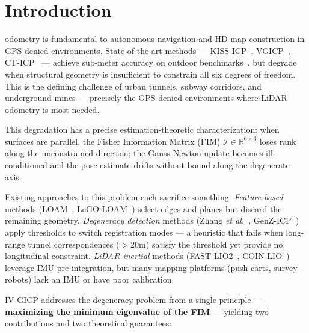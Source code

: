 \documentclass[journal,letterpaper,10pt]{IEEEtran}
\newcommand{\FIM}{\mathcal{I}}
\newcommand{\etal}{\textit{et al.}}
\begin{document}
\section{Introduction}\label{sec:intro}

 odometry is fundamental to autonomous navigation and HD map
construction in GPS-denied environments.
State-of-the-art methods --- KISS-ICP~\cite{vizzo2023kiss},
VGICP~\cite{koide2021voxel}, CT-ICP~\cite{dellenbach2022ct} ---
achieve sub-meter accuracy on outdoor benchmarks~\cite{geiger2013kitti},
but degrade when structural geometry is insufficient to constrain all
six degrees of freedom.
This is the defining challenge of urban tunnels, subway corridors, and
underground mines --- precisely the GPS-denied environments where
LiDAR odometry is most needed.

This degradation has a precise estimation-theoretic characterization:
when surfaces are parallel, the Fisher Information Matrix (FIM)
$\FIM \in \mathbb{R}^{6\times6}$ loses rank along the unconstrained
direction; the Gauss-Newton update becomes ill-conditioned and the
pose estimate drifts without bound along the degenerate axis.

Existing approaches to this problem each sacrifice something.
\textit{Feature-based} methods (LOAM~\cite{zhang2014loam},
LeGO-LOAM~\cite{shan2018lego}) select edges and planes but discard
the remaining geometry.
\textit{Degeneracy detection} methods
(Zhang \etal~\cite{zhang2016degeneracy},
GenZ-ICP~\cite{zhang2024genz})
apply thresholds to switch registration modes --- a heuristic
that fails when long-range tunnel correspondences ($>$20m) satisfy the
threshold yet provide no longitudinal constraint.
\textit{LiDAR-inertial} methods
(FAST-LIO2~\cite{xu2022fastlio2}, COIN-LIO~\cite{pfreundschuh2024coinlio})
leverage IMU pre-integration, but many mapping platforms
(push-carts, survey robots) lack an IMU or have poor calibration.

IV-GICP addresses the degeneracy problem from a single principle ---
\textbf{maximizing the minimum eigenvalue of the FIM} --- yielding
two contributions and two theoretical guarantees:
\end{document}
